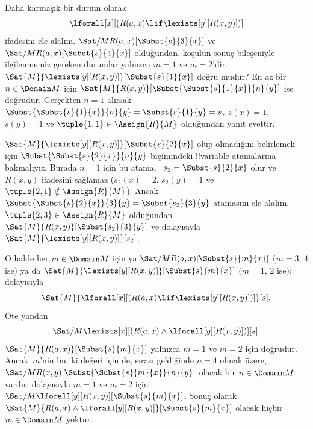 \documentclass[../../../include/open-logic-section]{subfiles}
\begin{document}
\begin{ex}

Daha karmaşık bir durum olarak
\[
\lforall[x][(R(a,x) \lif \lexists[y][R(x,y)])]
\]
ifadesini ele alalım. $\Sat/{M}{R(a,x)}[\Subst{s}{3}{x}]$ ve
$\Sat/{M}{R(a,x)}[\Subst{s}{4}{x}]$ olduğundan, koşulun sonuç
bileşeniyle ilgilenmemiz gereken durumlar yalnızca $m = 1$ ve
$m = 2$'dir. $\Sat{M}{\lexists[y][R(x,y)]}[\Subst{s}{1}{x}]$ doğru
mudur? En az bir $n \in \Domain M$ için
$\Sat{M}{R(x,y)}[\Subst{\Subst{s}{1}{x}}{n}{y}]$ ise doğrudur. Gerçekten
$n = 1$ alırsak $\Subst{\Subst{s}{1}{x}}{n}{y} = \Subst{s}{1}{y} =
s$. $s(x) = 1$, $s(y) = 1$ ve $\tuple{1,1} \in \Assign{R}{M}$
olduğundan yanıt evettir.

$\Sat{M}{\lexists[y][R(x,y)]}[\Subst{s}{2}{x}]$ olup olmadığını
belirlemek için $\Subst{\Subst{s}{2}{x}}{n}{y}$ biçimindeki
!!{variable} atamalarına bakmalıyız. Burada $n = 1$ için bu atama,
~$s_2 = \Subst{s}{2}{x}$ olur ve $R(x,y)$ ifadesini sağlamaz
($s_2(x) = 2$, $s_2(y) = 1$ ve $\tuple{2,1}\notin \Assign{R}{M}$).
Ancak $\Subst{\Subst{s}{2}{x}}{3}{y} = \Subst{s_2}{3}{y}$ atamasını
ele alalım. $\tuple{2,3} \in \Assign{R}{M}$ olduğundan
$\Sat{M}{R(x,y)}[\Subst{s_2}{3}{y}]$ ve dolayısıyla
$\Sat{M}{\lexists[y][R(x,y)]}[s_2]$.

O halde her $m \in \Domain M$ için ya
$\Sat/{M}{R(a,x)}[\Subst{s}{m}{x}]$ ($m = 3$, $4$ ise) ya da
$\Sat{M}{\lexists[y][R(x,y)]}[\Subst{s}{m}{x}]$ ($m = 1$, $2$ ise);
dolayısıyla
\[
\Sat{M}{\lforall[x][(R(a,x) \lif \lexists[y][R(x,y)])]}[s].
\]
Öte yandan
\[
\Sat/{M}{\lexists[x][(R(a,x) \land \lforall[y][R(x,y)])]}[s].
\]
$\Sat{M}{R(a,x)}[\Subst{s}{m}{x}]$ yalnızca $m = 1$ ve $m = 2$ için
doğrudur. Ancak~$m$'nin bu iki değeri için de, sırası geldiğinde
$n = 4$ olmak üzere, $\Sat/{M}{R(x,y)}[\Subst{\Subst{s}{m}{x}}{n}{y}]$
olacak bir $n \in \Domain M$ vardır; dolayısıyla $m = 1$ ve $m = 2$
için $\Sat/{M}{\lforall[y][R(x,y)]}[\Subst{s}{m}{x}]$. Sonuç olarak
$\Sat{M}{R(a,x) \land \lforall[y][R(x,y)]}[\Subst{s}{m}{x}]$ olacak
hiçbir $m \in \Domain M$ yoktur.
\end{ex}
\end{document}
